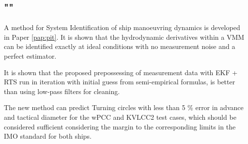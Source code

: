 \subsection*{""}
A method for System Identification of ship manoeuvring dynamics is developed in Paper \ref{pap:pit}. It is shown that the hydrodynamic derivatives within a VMM can be identified exactly at ideal conditions with no measurement noise and a perfect estimator.

It is shown that the proposed prepossessing of measurement data with EKF + RTS run in iteration with initial guess from semi-empirical formulas, is better than using low-pass filters for cleaning.

The new method can predict Turning circles with less than 5 \% error in advance and tactical diameter for the wPCC and KVLCC2 test cases, which should be considered sufficient considering the margin to the corresponding limits in the IMO standard for both ships.